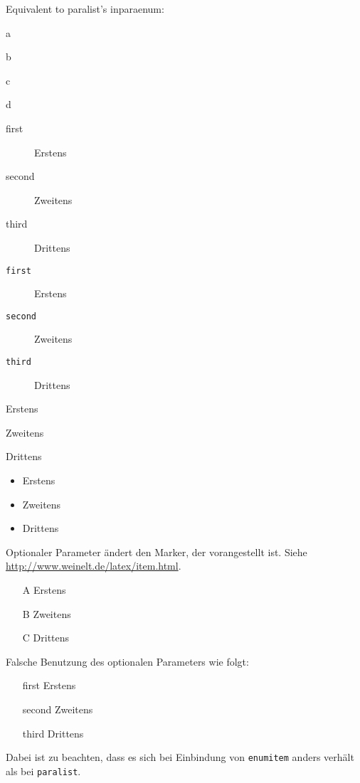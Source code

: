 \documentclass[paper=a5,twoside,fontsize=10pt, DIV=calc, headings=small,bibliography=totoc, listof=totoc]{scrbook}
\begin{document}
Equivalent to paralist's inparaenum:
\begin{enumerate*}[label=\alph*)]
\item a
\item b
\item c
\item d
\end{enumerate*}

\begin{description}
\item[first] Erstens
\item[second] Zweitens
\item[third] Drittens
\end{description}

\begin{description}
\item[\texttt{first}] Erstens
\item[\texttt{second}] Zweitens
\item[\texttt{third}] Drittens
\end{description}

\begin{description}[font=\ttfamily]
\item[first] Erstens
\item[second] Zweitens
\item[third] Drittens
\end{description}

\begin{itemize}
\item Erstens
\item Zweitens
\item Drittens
\end{itemize}

Optionaler Parameter ändert den Marker, der vorangestellt ist. Siehe \url{http://www.weinelt.de/latex/item.html}.
\begin{itemize}
\item[A] Erstens
\item[B] Zweitens
\item[C] Drittens
\end{itemize}

Falsche Benutzung des optionalen Parameters wie folgt:
\begin{itemize}
\item[first] Erstens
\item[second] Zweitens
\item[third] Drittens
\end{itemize}
Dabei ist zu beachten, dass es sich bei Einbindung von \texttt{enumitem} anders verhält als bei \texttt{paralist}.
\end{document}
